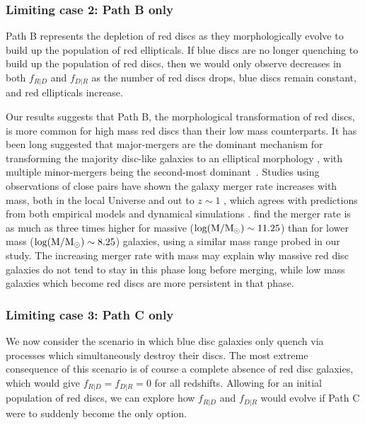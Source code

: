 \documentclass[useAMS,usenatbib]{mn2e}
\begin{document}
\subsubsection{Limiting case 2: Path B only}

Path B represents the depletion of red discs as they morphologically evolve to build up the population of red ellipticals. If blue discs are no longer quenching to build up the population of red discs, then we would only observe decreases in both $f_{R|D}$ and $f_{D|R}$ as the number of red discs drops, blue discs remain constant, and red ellipticals increase. 

Our results suggests that Path B, the morphological transformation of red discs, is more common for high mass red discs than their low mass counterparts. It has been long suggested that major-mergers are the dominant mechanism for transforming the majority disc-like galaxies to an elliptical morphology \citep{Toomre1977,Schweizer1982,Schweizer1990}, with multiple minor-mergers being the second-most dominant~\citep{Bundy2009,Hopkins2010b}. Studies using observations of close pairs have shown the galaxy merger rate increases with mass, both in the local Universe \citep{Xu2004,Patton2008,Domingue2009,Robotham2014,Casteels2014} and out to $z\sim1$ \citep{Xu2012,Bundy2009}, which agrees with predictions from both empirical models and dynamical simulations \citep{Hopkins2010a,Hopkins2010b,Maller2006}. \citet{Casteels2014} find the merger rate is as much as three times higher for massive ($\rm log(M/M_{\odot})\sim11.25$) than for lower mass ($\rm log(M/M_{\odot})\sim8.25$) galaxies, using a similar mass range probed in our study. The increasing merger rate with mass may explain why massive red disc galaxies do not tend to stay in this phase long before merging, while low mass galaxies which become red discs are more persistent in that phase. 
 

\subsubsection{Limiting case 3: Path C only}
We now consider the scenario in which blue disc galaxies only quench via processes which simultaneously destroy their discs. The most extreme consequence of this scenario is of course a complete absence of red disc galaxies, which would give $f_{R|D}=f_{D|R}=0$ for all redshifts. Allowing for an initial population of red discs, we can explore how $f_{R|D}$ and $f_{D|R}$ would evolve if Path C were to suddenly become the only option. 
\end{document}

